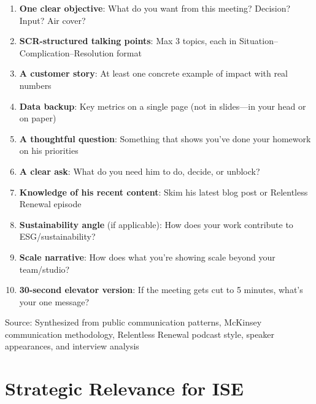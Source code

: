 \documentclass[11pt,a4paper]{article}
\begin{document}
\begin{enumerate}
    \item[$\square$] \textbf{One clear objective}: What do you want from this meeting? Decision? Input? Air cover?
    \item[$\square$] \textbf{SCR-structured talking points}: Max 3 topics, each in Situation--Complication--Resolution format
    \item[$\square$] \textbf{A customer story}: At least one concrete example of impact with real numbers
    \item[$\square$] \textbf{Data backup}: Key metrics on a single page (not in slides---in your head or on paper)
    \item[$\square$] \textbf{A thoughtful question}: Something that shows you've done your homework on his priorities
    \item[$\square$] \textbf{A clear ask}: What do you need him to do, decide, or unblock?
    \item[$\square$] \textbf{Knowledge of his recent content}: Skim his latest blog post or Relentless Renewal episode
    \item[$\square$] \textbf{Sustainability angle} (if applicable): How does your work contribute to ESG/sustainability?
    \item[$\square$] \textbf{Scale narrative}: How does what you're showing scale beyond your team/studio?
    \item[$\square$] \textbf{30-second elevator version}: If the meeting gets cut to 5 minutes, what's your one message?
\end{enumerate}

\textcolor{msgray}{\scriptsize Source: Synthesized from public communication patterns, McKinsey communication methodology, Relentless Renewal podcast style, speaker appearances, and interview analysis}

\newpage

\section{Strategic Relevance for ISE}
\end{document}
